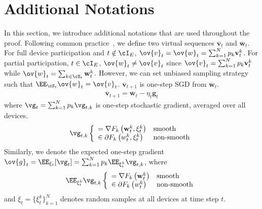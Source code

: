 
\section{Additional Notations}
In this section, we introduce additional notations that are used throughout
the proof. Following common practice~\cite{stich2018local,li2019convergence}, we define two virtual sequences $\overline{\mathbf{v}}_{t}$ and $\overline{\mathbf{w}}_{t}$. For full device participation and $t \notin \cI_E$,
$\ov{v}_t = \ov{w}_t =\sum_{k=1}^{N} p_{k} \mathbf{v}_{t}^{k}$. For partial participation, $t \in \cI_E$, $\ov{w}_t \neq \ov{v}_t$ since $\ov{v}_t=\sum_{k=1}^{N} p_{k} \mathbf{v}_{t}^{k}$ while $\ov{w}_t=\sum_{k\in \cS_t}\mathbf{w}_{t}^{k}$. However, we can
set unbiased sampling strategy such that $ \EE_{\cS_t} \ov{w}_t = \ov{v}_t$.
$\overline{\mathbf{v}}_{t+1}$ is one-step SGD from $\overline{\mathbf{w}}_{t}$. 
\begin{align}
\overline{\mathbf{v}}_{t+1}=\overline{\mathbf{w}}_{t}-\eta_{t} \mathbf{g}_{t}	\label{eq:vbar}
\end{align}
where $\vg_{t} = \sum_{k=1}^{N} p_{k} \vg_{t,k} $ is one-step stochastic gradient, averaged over all devices. 
\begin{align}
\vg_{t,k} \left\{\begin{array}{ll} 
 = \nabla F_{k}\left(\mathbf{w}_{t}^{k},\xi_{t}^{k} \right)  &  \text{smooth}\\
 \in \partial F_{k}\left(w_{t}^{k}, \xi_{t}^{k}\right)  & \text{non-smooth}
 \end{array}\right.
\end{align}
Similarly, we denote the expected one-step gradient $\ov{g}_{t}= \EE_{\xi_t}[\vg_t] = \sum_{k=1}^{N} p_{k} \EE_{\xi_{t}^{k}} \vg_{t,k}$, where
\begin{align}
\EE_{\xi_{t}^{k}} \vg_{t,k}  \left\{\begin{array}{ll} 
 = \nabla F_{k}\left(\mathbf{w}_{t}^{k}\right)  &  \text{smooth}\\
 \in \partial F_{k}\left(w_{t}^{k}\right)  & \text{non-smooth}
 \end{array}\right.
\end{align}
and $\xi_t = \{\xi_t^k\}_{k=1}^N$ denotes random samples at all devices at time step $t$. 
